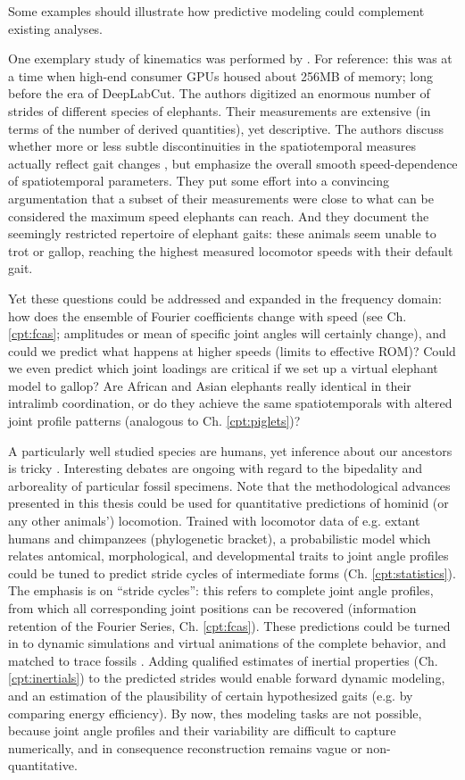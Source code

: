 Some examples should illustrate how predictive modeling could complement existing analyses.

One exemplary study of kinematics was performed by \citet{Hutchinson2006}.
For reference: this was at a time when high-end consumer GPUs housed about 256MB of memory; long before the era of DeepLabCut.
The authors digitized an enormous number of strides of different species of elephants.
Their measurements are extensive (in terms of the number of derived quantities), yet descriptive.
The authors discuss whether more or less subtle discontinuities in the spatiotemporal measures actually reflect gait changes \citep{Alexander1989}, but emphasize the overall smooth speed-dependence of spatiotemporal parameters.
They put some effort into a convincing argumentation that a subset of their measurements were close to what can be considered the maximum speed elephants can reach.
And they document the seemingly restricted repertoire of elephant gaits: these animals seem unable to trot or gallop, reaching the highest measured locomotor speeds with their default gait.

Yet these questions could be addressed and expanded in the frequency domain: how does the ensemble of Fourier coefficients change with speed (see Ch. \ref{cpt:fcas}; amplitudes or mean of specific joint angles will certainly change), and could we predict what happens at higher speeds (limits to effective ROM)?
Could we even predict which joint loadings are critical if we set up a virtual elephant model to gallop?
Are African and Asian elephants really identical in their intralimb coordination, or do they achieve the same spatiotemporals with altered joint profile patterns (analogous to Ch. \ref{cpt:piglets})?


A particularly well studied species are humans, yet inference about our ancestors is tricky \citep{Polk2004,Cazenave2023,Stamos2023}.
Interesting debates are ongoing with regard to the bipedality and arboreality of particular fossil specimens.
Note that the methodological advances presented in this thesis could be used for quantitative predictions of hominid (or any other animals') locomotion.
Trained with locomotor data of e.g. extant humans and chimpanzees (phylogenetic bracket), a probabilistic model which relates antomical, morphological, and developmental traits to joint angle profiles could be tuned to predict stride cycles of intermediate forms (Ch. \ref{cpt:statistics}).
The emphasis is on ``stride cycles'': this refers to complete joint angle profiles, from which all corresponding joint positions can be recovered (information retention of the Fourier Series, Ch. \ref{cpt:fcas}).
These predictions could be turned in to dynamic simulations and virtual animations of the complete behavior, and matched to trace fossils \citep[as in][, but with less manual work]{Nyakatura2019}.
Adding qualified estimates of inertial properties (Ch. \ref{cpt:inertials}) to the predicted strides would enable forward dynamic modeling, and an estimation of the plausibility of certain hypothesized gaits (e.g. by comparing energy efficiency).
By now, thes modeling tasks are not possible, because joint angle profiles and their variability are difficult to capture numerically, and in consequence reconstruction remains vague or non-quantitative.


